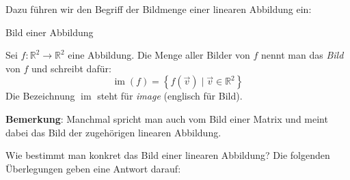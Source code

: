 Dazu führen wir den Begriff der Bildmenge einer linearen Abbildung ein:
\begin{definition}
    {Bild einer Abbildung}{}
   

Sei \( f \colon \mathbb{R}^2 \to \mathbb{R}^2 \) eine Abbildung.  
Die Menge aller Bilder von \( f \) nennt man das \emph{Bild} von \( f \) und schreibt dafür:
\[
\operatorname{im}(f) = \left\{ f(\vec{v}) \mid \vec{v} \in \mathbb{R}^2 \right\}
\]
Die Bezeichnung \( \operatorname{im} \) steht für \emph{image} (englisch für Bild).



\end{definition}
\textbf{Bemerkung}: Manchmal spricht man auch vom Bild einer Matrix und meint dabei das Bild der zugehörigen linearen Abbildung.

Wie bestimmt man konkret das Bild einer linearen Abbildung? Die folgenden Überlegungen geben eine Antwort darauf:



